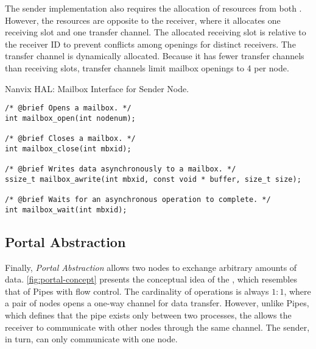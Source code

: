 
				The sender implementation also requires the allocation of resources
				from both \nocs. However, the resources are opposite to the receiver,
				where it allocates one \cnoc receiving slot and one \dnoc transfer channel.
				The allocated \cnoc receiving slot is relative to the receiver ID to
				prevent conflicts among openings for distinct receivers. The transfer
				channel is dynamically allocated. Because it has fewer transfer channels
				than receiving slots, transfer channels limit mailbox openings to 4 per node.

\begin{listing}[!tb]
\caption{Nanvix HAL: Mailbox Interface for Sender Node.}
\label{code:hal-mailbox-sender}
\begin{verbatim}
/* @brief Opens a mailbox. */
int mailbox_open(int nodenum);

/* @brief Closes a mailbox. */
int mailbox_close(int mbxid);

/* @brief Writes data asynchronously to a mailbox. */
ssize_t mailbox_awrite(int mbxid, const void * buffer, size_t size);

/* @brief Waits for an asynchronous operation to complete. */
int mailbox_wait(int mbxid);
\end{verbatim}
\end{listing}

		\subsection{Portal Abstraction}
		\label{sec.portal-abs}

			Finally, \textit{Portal Abstraction} allows two nodes to exchange arbitrary
			amounts of data. \autoref{fig:portal-concept} presents the conceptual idea
			of the \portal, which resembles that of \posix Pipes with flow control.
			The cardinality of operations is always $1:1$, where a pair of nodes opens
			a one-way channel for data transfer. However, unlike \posix Pipes, which
			defines that the pipe exists only between two processes, the \portal allows
			the receiver to communicate with other nodes through the same channel.
			The sender, in turn, can only communicate with one node.

